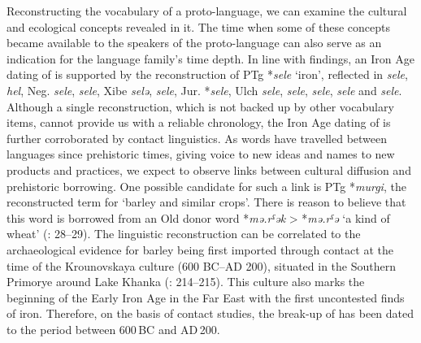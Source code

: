 \documentclass[output=paper,colorlinks,citecolor=brown]{langscibook}
\begin{document}
Reconstructing the vocabulary of a proto-language, we can examine the cultural and ecological concepts revealed in it. The time when some of these concepts became available to the speakers of the proto-language can also serve as an indication for the language family’s time depth. In line with  findings, an Iron Age dating of  is supported by the reconstruction of PTg *\textit{sele} `iron', reflected in  \textit{sele},  \textit{hel}, Neg. \textit{sele},  \textit{sele}, Xibe \textit{selǝ},  \textit{sele}, Jur. *\textit{sele}, Ulch \textit{sele},  \textit{sele},  \textit{sele},  \textit{sele} and  \textit{sele}. Although a single reconstruction, which is not backed up by other vocabulary items, cannot provide us with a reliable chronology, the Iron Age dating of  is further corroborated by contact linguistics. As words have travelled between languages since prehistoric times, giving voice to new ideas and names to new products and practices, we expect to observe links between cultural diffusion and prehistoric borrowing. One possible candidate for such a link is PTg *\textit{murgi}, the reconstructed term for ‘barley and similar crops’. There is reason to believe that this word is borrowed from an Old  donor word  *\textit{mə.rˤək} > *\textit{mə.rˤə} ‘a kind of wheat’ (\citealt{Robbeets2017a}: 28--29). The linguistic reconstruction can be correlated to the archaeological evidence for barley being first imported through  contact at the time of the Krounovskaya culture (600 BC--AD 200), situated in the Southern Primorye around Lake Khanka (\citealt{Sergusheva2009}: 214--215). This culture also marks the beginning of the Early Iron Age in the  Far East with the first uncontested finds of iron. Therefore, on the basis of contact studies, the break-up of  has been dated to the period between 600\,BC and AD\,200.
\end{document}
